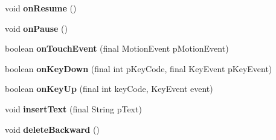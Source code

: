 \begin{DoxyCompactItemize}
void {\bfseries on\+Resume} ()
\item 
\mbox{\label{classorg_1_1cocos2dx_1_1lib_1_1Cocos2dxGLSurfaceView_ab4961c7887f9d02eb468be8a23267d22}} 
void {\bfseries on\+Pause} ()
\item 
\mbox{\label{classorg_1_1cocos2dx_1_1lib_1_1Cocos2dxGLSurfaceView_ae0a3062fe9a14db2fb53538b813bed4b}} 
boolean {\bfseries on\+Touch\+Event} (final Motion\+Event p\+Motion\+Event)
\item 
\mbox{\label{classorg_1_1cocos2dx_1_1lib_1_1Cocos2dxGLSurfaceView_aaabc8df13baccbaef6b8a00fe143bdd5}} 
boolean {\bfseries on\+Key\+Down} (final int p\+Key\+Code, final Key\+Event p\+Key\+Event)
\item 
\mbox{\label{classorg_1_1cocos2dx_1_1lib_1_1Cocos2dxGLSurfaceView_aab4fab736387b2bd97ac33c858061a6e}} 
boolean {\bfseries on\+Key\+Up} (final int key\+Code, Key\+Event event)
\item 
\mbox{\label{classorg_1_1cocos2dx_1_1lib_1_1Cocos2dxGLSurfaceView_abde090747354425a9ad59157b2c278d6}} 
void {\bfseries insert\+Text} (final String p\+Text)
\item 
\mbox{\label{classorg_1_1cocos2dx_1_1lib_1_1Cocos2dxGLSurfaceView_a462a696e0c9c7ee4c794be843286105b}} 
void {\bfseries delete\+Backward} ()
\end{DoxyCompactItemize}

